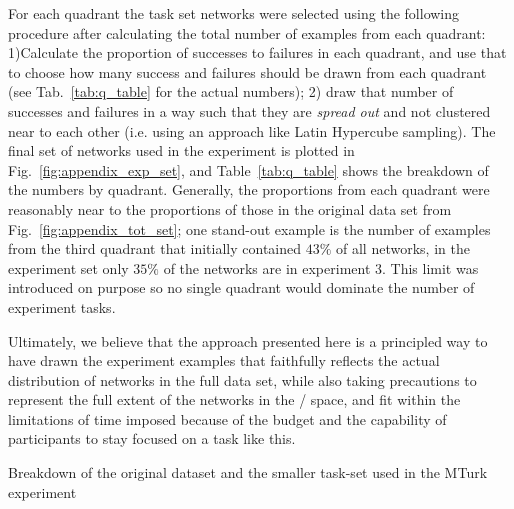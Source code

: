 For each quadrant the task set networks were selected using the following procedure after calculating the total number of examples from each quadrant: 1)Calculate the proportion of successes to failures in each quadrant, and use that to choose how many success and failures should be drawn from each quadrant (see Tab.~\ref{tab:q_table} for the actual numbers); 2) draw that number of successes and failures in a way such that they are \emph{spread out} and not clustered near to each other (i.e. using an approach like Latin Hypercube sampling). The final set of networks used in the experiment is plotted in Fig.~\ref{fig:appendix_exp_set}, and Table~\ref{tab:q_table} shows the breakdown of the numbers by quadrant. Generally, the proportions from each quadrant were reasonably near to the proportions of those in the original data set from Fig.~\ref{fig:appendix_tot_set}; one stand-out example is the number of examples from the third quadrant that initially contained $43\%$ of all networks, in the experiment set only $35\%$ of the networks are in experiment 3. This limit was introduced on purpose so no single quadrant would dominate the number of experiment tasks.

Ultimately, we believe that the approach presented here is a principled way to have drawn the experiment examples that faithfully reflects the actual distribution of networks in the full data set, while also taking precautions to represent the full extent of the networks in the \xQ/\xO{} space, and fit within the limitations of time imposed because of the budget and the capability of participants to stay focused on a task like this.

\begin{table}
    \centering
    \caption{Breakdown of the original dataset and the smaller task-set used in the MTurk experiment}
    \label{tab:q_table}
    
\end{table}
